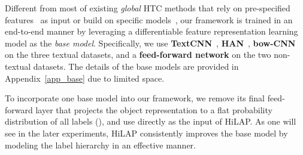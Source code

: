 \documentclass[11pt,a4paper]{article}
\newcommand{\start}[1]{\vspace{1.8mm}\noindent{{\bf #1}}}
\begin{document}
\begin{table}[t]
    \caption{\textbf{Statistics of the datasets.}  denotes the number of labels in the label hierarchy. Avg()  and Max() denote the average and maximum number of labels of one object, respectively.} 
    \label{table_data}
    \vspace*{-.2cm}
    \centering
\vspace*{-.1cm}
\end{table}

\start{Base Models for Feature Encoding.}
Different from most of existing \textit{global} HTC methods that rely on pre-specified features~\citep{gopal2013recursive} as input or build on specific models~\citep{cai2004hierarchical,vens2008decision,silla2009global}, our framework is trained in an end-to-end manner by leveraging a differentiable feature representation learning model as the \textit{base model}.
Specifically, we use \textbf{TextCNN}~\citep{kim2014convolutional}, \textbf{HAN}~\citep{yang2016hierarchical}, \textbf{bow-CNN}~\citep{johnson2014effective} on the three textual datasets, and a \textbf{feed-forward network} on the two non-textual datasets.
The details of the base models are provided in Appendix~\ref{app_base} due to limited space.

To incorporate one base model into our framework, we remove its final feed-forward layer that projects the object representation  to a flat probability distribution of all labels (), and use  directly as the input of HiLAP. As one will see in the later experiments, HiLAP consistently improves the base model by modeling the label hierarchy in an effective manner.
\end{document}
